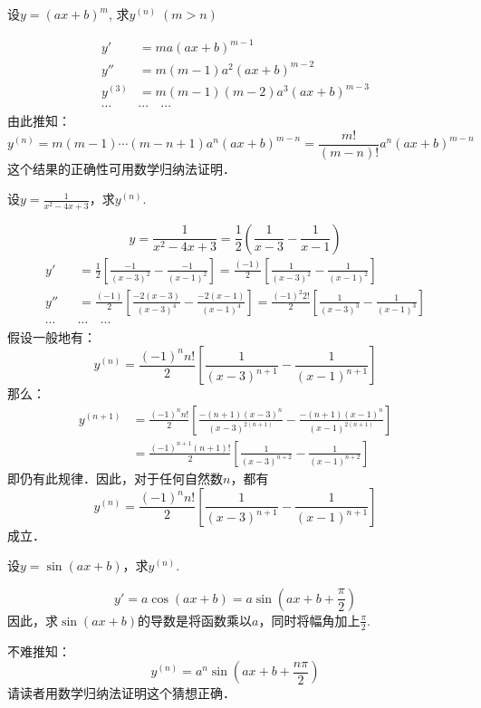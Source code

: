 \begin{example}
  设$y=(ax+b)^m$, 求$y^{(n)}\; (m>n)$  
\end{example}

\begin{solution}
\begin{align*}
y'&=ma(ax+b)^{m-1}\\
y''&=m(m-1)a^2(ax+b)^{m-2}\\
y^{(3)}&=m(m-1)(m-2)a^3(ax+b)^{m-3}\\
\cdots\quad &\cdots\quad \cdots
\end{align*}
由此推知：
\[y^{(n)}=m(m-1)\cdots(m-n+1)a^n(ax+b)^{m-n}=\frac{m!}{(m-n)!}a^n(ax+b)^{m-n}\]
这个结果的正确性可用数学归纳法证明．
\end{solution}


\begin{example}
设$y=\frac{1}{x^2-4x+3}$，求$y^{(n)}$.
\end{example}


\begin{solution}
\[y=\frac{1}{x^2-4x+3}=\frac{1}{2}\left(\frac{1}{x-3}-\frac{1}{x-1}\right)\]
\begin{align*}
    y'&=\frac{1}{2}\left[\frac{-1}{(x-3)^2}-\frac{-1}{(x-1)^2}\right]=\frac{(-1)}{2}\left[\frac{1}{(x-3)^2}-\frac{1}{(x-1)^2}\right]\\
    y''&=\frac{(-1)}{2}\left[\frac{-2(x-3)}{(x-3)^4}-\frac{-2(x-1)}{(x-1)^4}\right]=\frac{(-1)^2 2!}{2}\left[\frac{1}{(x-3)^3}-\frac{1}{(x-1)^3}\right]\\
    \cdots\quad &\cdots\quad \cdots
\end{align*}
假设一般地有：
\[y^{(n)}=\frac{(-1)^n n!}{2}\left[\frac{1}{(x-3)^{n+1}}-\frac{1}{(x-1)^{n+1}}\right]\]
那么：
\begin{align*}
    y^{(n+1)}&=\frac{(-1)^n n!}{2}\left[\frac{-(n+1)(x-3)^n}{(x-3)^{2(n+1)}}-\frac{-(n+1)(x-1)^n}{(x-1)^{2(n+1)}}\right]\\
    &=\frac{(-1)^{n+1} (n+1)!}{2}\left[\frac{1}{(x-3)^{n+2}}-\frac{1}{(x-1)^{n+2}}\right]
\end{align*}
即仍有此规律．因此，对于任何自然数$n$，都有
\[y^{(n)}=\frac{(-1)^n n!}{2}\left[\frac{1}{(x-3)^{n+1}}-\frac{1}{(x-1)^{n+1}}\right]\]
成立．
\end{solution}

\begin{example}
    设$y=\sin(ax+b)$，求$y^{(n)}$.
\end{example}


\begin{solution}
    \[y'=a\cos(ax+b)=a\sin\left(ax+b+\frac{\pi}{2}\right)\]
因此，求$\sin(ax+b)$的导数是将函数乘以$a$，同时将幅角加上$\frac{\pi}{2}$.

不难推知：
\[y^{(n)}=a^n\sin\left(ax+b+\frac{n\pi}{2}\right)\]
请读者用数学归纳法证明这个猜想正确．
\end{solution}

